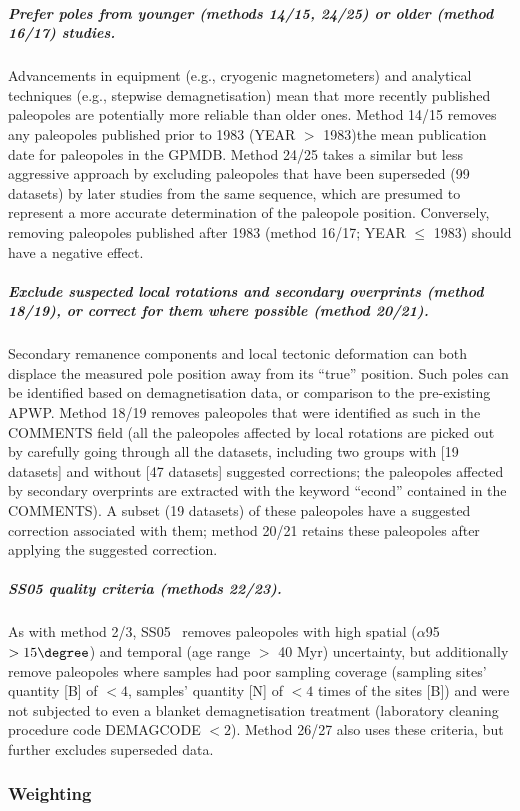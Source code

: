 \subparagraph{Prefer poles from younger (methods 14/15, 24/25) or older (method
16/17) studies.} Advancements in equipment (e.g., cryogenic magnetometers) and
analytical techniques (e.g., stepwise demagnetisation) mean that more recently
published paleopoles are potentially more reliable than older ones. Method 14/15
removes any paleopoles published prior to 1983 (YEAR $>$ 1983)\textemdash{}the
mean publication date for paleopoles in the GPMDB\@. Method 24/25 takes a
similar but less aggressive approach by excluding paleopoles that have been
superseded (99 datasets) by later studies from the same sequence, which are
presumed to represent a more accurate determination of the paleopole position.
Conversely, removing paleopoles published after 1983 (method 16/17; YEAR $\leq$
1983) should have a negative effect.

\subparagraph{Exclude suspected local rotations and secondary overprints (method
18/19), or correct for them where possible (method 20/21).} Secondary remanence
components and local tectonic deformation can both displace the measured pole
position away from its ``true'' position. Such poles can be identified based on
demagnetisation data, or comparison to the pre-existing APWP\@. Method 18/19
removes paleopoles that were identified as such in the COMMENTS field (all the
paleopoles affected by local rotations are picked out by carefully going through
all the datasets, including two groups with [19 datasets] and without [47
datasets] suggested corrections; the paleopoles affected by secondary overprints
are extracted with the keyword ``econd'' contained in the COMMENTS). A subset
(19 datasets) of these paleopoles have a suggested correction associated with
them; method 20/21 retains these paleopoles after applying the suggested
correction.

\subparagraph{SS05 quality criteria (methods 22/23).} As with method 2/3,
SS05~\cite{S05} removes paleopoles with high spatial ($\alpha$95 $>15\degree$)
and temporal (age range $>$ 40 Myr) uncertainty, but additionally remove
paleopoles where samples had poor sampling coverage (sampling sites' quantity
[B] of $<4$, samples' quantity [N] of $<4$ times of the sites [B]) and were not
subjected to even a blanket demagnetisation treatment (laboratory cleaning
procedure code DEMAGCODE $<2$). Method 26/27 also uses these criteria, but
further excludes superseded data.

\subsubsection{Weighting}


